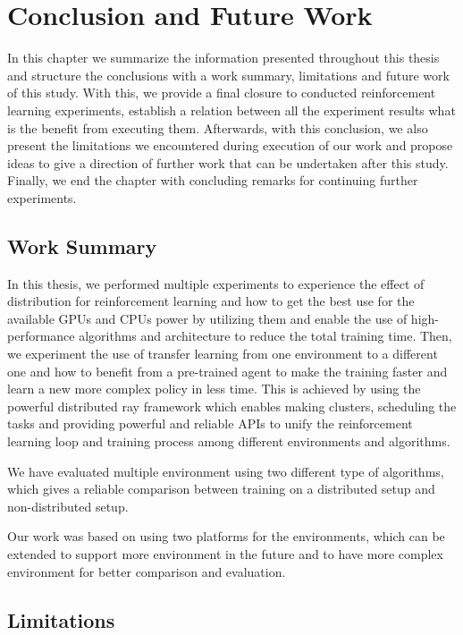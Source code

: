 
\chapter{Conclusion and Future Work}\label{chapter:conclusion_and_future_work}

In this chapter we summarize the information presented throughout this thesis and structure the conclusions with a work summary, limitations and future work of this study. With this, we provide a final closure to conducted reinforcement learning experiments, establish a relation between all the experiment results what is the benefit from executing them. Afterwards, with this conclusion, we also present the limitations we encountered during execution of our work and propose ideas to give a direction of further work that can be undertaken after this study. Finally, we end the chapter with concluding remarks for continuing further experiments.

\section{Work Summary}
In this thesis, we performed multiple experiments to experience the effect of distribution for reinforcement learning and how to get the best use for the available GPUs and CPUs power by utilizing them and enable the use of high-performance algorithms and architecture to reduce the total training time. Then, we experiment the use of transfer learning from one environment to a different one and how to benefit from a pre-trained agent to make the training faster and learn a new more complex policy in less time. This is achieved by using the powerful distributed ray framework which enables making clusters, scheduling the tasks and providing powerful and reliable APIs to unify the reinforcement learning loop and training process among different environments and algorithms. 

We have evaluated multiple environment using two different type of algorithms, which gives a reliable comparison between training on a distributed setup and non-distributed setup. 

Our work was based on using two platforms for the environments, which can be extended to support more environment in the future and to have more complex environment for better comparison and evaluation.

\section{Limitations}

